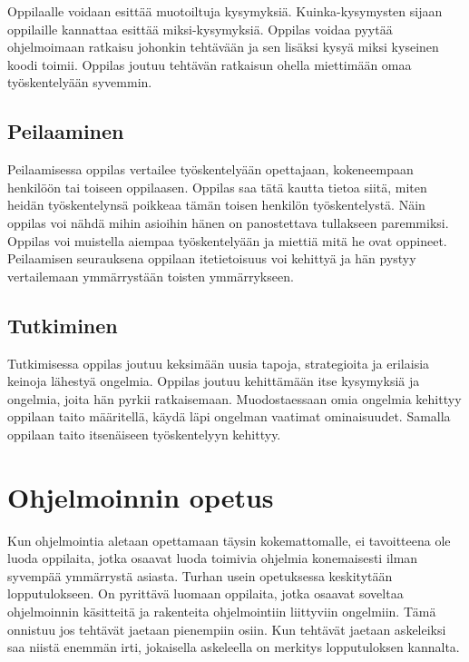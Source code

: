 \documentclass[finnish]{tktltiki2}
\theoremstyle{definition}
\theoremstyle{remark}
\begin{document}
Oppilaalle voidaan esittää muotoiltuja kysymyksiä. Kuinka-kysymysten sijaan oppilaille kannattaa esittää miksi-kysymyksiä. Oppilas voidaa pyytää ohjelmoimaan ratkaisu johonkin tehtävään ja sen lisäksi kysyä miksi kyseinen koodi toimii. Oppilas joutuu tehtävän ratkaisun ohella miettimään omaa työskentelyään syvemmin. \cite{cutts2012}

\subsection{Peilaaminen}
Peilaamisessa oppilas vertailee työskentelyään opettajaan, kokeneempaan henkilöön tai toiseen oppilaasen. Oppilas saa tätä kautta tietoa siitä, miten heidän työskentelynsä poikkeaa tämän toisen henkilön työskentelystä. Näin oppilas voi nähdä mihin asioihin hänen on panostettava tullakseen paremmiksi. Oppilas voi muistella aiempaa työskentelyään ja miettiä mitä he ovat oppineet. Peilaamisen seurauksena oppilaan itetietoisuus voi kehittyä ja hän pystyy vertailemaan ymmärrystään toisten ymmärrykseen.

\subsection{Tutkiminen}
Tutkimisessa oppilas joutuu keksimään uusia tapoja, strategioita ja erilaisia keinoja lähestyä ongelmia. Oppilas joutuu kehittämään itse kysymyksiä ja ongelmia, joita hän pyrkii ratkaisemaan. Muodostaessaan omia ongelmia kehittyy oppilaan taito määritellä, käydä läpi ongelman vaatimat ominaisuudet. Samalla oppilaan taito itsenäiseen työskentelyyn kehittyy.

\section{Ohjelmoinnin opetus}
Kun ohjelmointia aletaan opettamaan täysin kokemattomalle, ei tavoitteena ole luoda oppilaita, jotka osaavat luoda toimivia ohjelmia konemaisesti ilman syvempää ymmärrystä asiasta. Turhan usein opetuksessa keskitytään lopputulokseen. On pyrittävä luomaan oppilaita, jotka osaavat soveltaa ohjelmoinnin käsitteitä ja rakenteita ohjelmointiin liittyviin ongelmiin. Tämä onnistuu jos tehtävät jaetaan pienempiin osiin. Kun tehtävät jaetaan askeleiksi saa niistä enemmän irti, jokaisella askeleella on merkitys lopputuloksen kannalta.\cite{cutts2012} 
\end{document}
